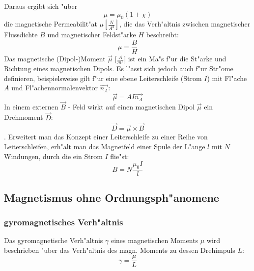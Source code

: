             Daraus ergibt sich "uber
            \begin{equation}
                \mu = \mu_0 (1 + \chi)
            \end{equation}
            die magnetische Permeabilit"at $\mu [\frac{N}{A^2}]$, die das Verh"altnis zwischen magnetischer Flussdichte $B$ und magnetischer Feldst"arke $H$ beschreibt:
            $$ \mu = \frac{B}{H}$$
            Das magnetische (Dipol-)Moment $\vec{\mu}$ [$\frac{A}{m^2}$] ist ein Ma"s f"ur die St"arke
            und Richtung eines magnetischen Dipols. Es l"asst sich jedoch auch f"ur Str"ome definieren, beispielsweise gilt f"ur eine ebene
            Leiterschleife (Strom $I$) mit Fl"ache $A$ und Fl"achennormalenvektor $\vec{n_A}$:
            \begin{equation}
                \vec{\mu} = A I \vec{n_A}
            \end{equation}
            In einem externen $\vec{B}$ - Feld wirkt auf einen magnetischen Dipol $\vec{\mu}$ ein Drehmoment $\vec{D}$:
            \begin{equation}
                \vec{D} = \vec{\mu} \times \vec{B}
            \end{equation}.
            Erweitert man das Konzept einer Leiterschleife zu einer Reihe von Leiterschleifen, erh"alt man das Magnetfeld einer Spule der L"ange $l$ mit $N$ Windungen, durch die ein Strom $I$ flie"st:
            \begin{equation}
                B = N \frac{\mu_0 I}{l}
            \end{equation}
    \subsection{Magnetismus ohne Ordnungsph"anomene}
        \subsubsection*{gyromagnetisches Verh"altnis}
            Das gyromagnetische Verh"altnis $\gamma$ eines magnetischen Moments $\mu$ wird beschrieben "uber das Verh"altnis
            des magn. Moments zu dessen Drehimpuls $L$:
            \begin{equation}
                \gamma = \frac{\mu}{L}
            \end{equation}
